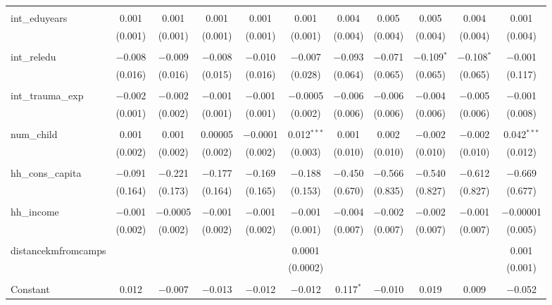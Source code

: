 \begin{table}[H]
\begin{tabular}{@{\extracolsep{4pt}}lcccccccccc}
  & & & & & & & & & & \\ 
 int\_eduyears & 0.001 & 0.001 & 0.001 & 0.001 & 0.001 & 0.004 & 0.005 & 0.005 & 0.004 & 0.001 \\ 
  & (0.001) & (0.001) & (0.001) & (0.001) & (0.001) & (0.004) & (0.004) & (0.004) & (0.004) & (0.004) \\ 
  & & & & & & & & & & \\ 
 int\_reledu & $-$0.008 & $-$0.009 & $-$0.008 & $-$0.010 & $-$0.007 & $-$0.093 & $-$0.071 & $-$0.109$^{*}$ & $-$0.108$^{*}$ & $-$0.001 \\ 
  & (0.016) & (0.016) & (0.015) & (0.016) & (0.028) & (0.064) & (0.065) & (0.065) & (0.065) & (0.117) \\ 
  & & & & & & & & & & \\ 
 int\_trauma\_exp & $-$0.002 & $-$0.002 & $-$0.001 & $-$0.001 & $-$0.0005 & $-$0.006 & $-$0.006 & $-$0.004 & $-$0.005 & $-$0.001 \\ 
  & (0.001) & (0.002) & (0.001) & (0.001) & (0.002) & (0.006) & (0.006) & (0.006) & (0.006) & (0.008) \\ 
  & & & & & & & & & & \\ 
 num\_child & 0.001 & 0.001 & 0.00005 & $-$0.0001 & 0.012$^{***}$ & 0.001 & 0.002 & $-$0.002 & $-$0.002 & 0.042$^{***}$ \\ 
  & (0.002) & (0.002) & (0.002) & (0.002) & (0.003) & (0.010) & (0.010) & (0.010) & (0.010) & (0.012) \\ 
  & & & & & & & & & & \\ 
 hh\_cons\_capita & $-$0.091 & $-$0.221 & $-$0.177 & $-$0.169 & $-$0.188 & $-$0.450 & $-$0.566 & $-$0.540 & $-$0.612 & $-$0.669 \\ 
  & (0.164) & (0.173) & (0.164) & (0.165) & (0.153) & (0.670) & (0.835) & (0.827) & (0.827) & (0.677) \\ 
  & & & & & & & & & & \\ 
 hh\_income & $-$0.001 & $-$0.0005 & $-$0.001 & $-$0.001 & $-$0.001 & $-$0.004 & $-$0.002 & $-$0.002 & $-$0.001 & $-$0.00001 \\ 
  & (0.002) & (0.002) & (0.002) & (0.002) & (0.001) & (0.007) & (0.007) & (0.007) & (0.007) & (0.005) \\ 
  & & & & & & & & & & \\ 
 distancekmfromcamps &  &  &  &  & 0.0001 &  &  &  &  & 0.001 \\ 
  &  &  &  &  & (0.0002) &  &  &  &  & (0.001) \\ 
  & & & & & & & & & & \\ 
 Constant & 0.012 & $-$0.007 & $-$0.013 & $-$0.012 & $-$0.012 & 0.117$^{*}$ & $-$0.010 & 0.019 & 0.009 & $-$0.052 \\ 

\end{tabular}
\end{table}
